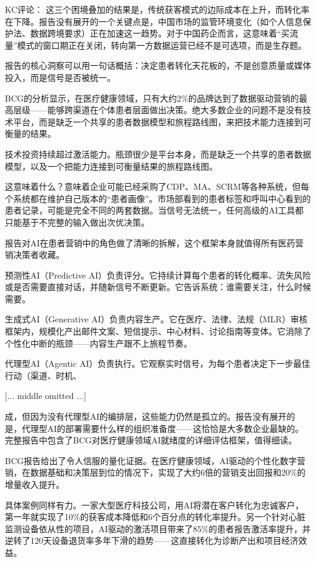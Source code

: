 \documentclass[11pt]{ctexart}
\begin{document}
KC评论： 这三个困境叠加的结果是，传统获客模式的边际成本在上升，而转化率在下降。报告没有展开的一个关键点是，中国市场的监管环境变化（如个人信息保护法、数据跨境要求）正在加速这一趋势。对于中国药企而言，这意味着“买流量”模式的窗口期正在关闭，转向第一方数据运营已经不是可选项，而是生存题。

报告的核心洞察可以用一句话概括：决定患者转化天花板的，不是创意质量或媒体投入，而是信号是否被统一。

BCG的分析显示，在医疗健康领域，只有大约2\%的品牌达到了数据驱动营销的最高层级——能够跨渠道在个体患者层面做出决策。绝大多数企业的问题不是没有技术平台，而是缺乏一个共享的患者数据模型和旅程路线图，来把技术能力连接到可衡量的结果。

技术投资持续超过激活能力。瓶颈很少是平台本身，而是缺乏一个共享的患者数据模型，以及一个把能力连接到可衡量结果的旅程路线图。

这意味着什么？意味着企业可能已经采购了CDP、MA、SCRM等各种系统，但每个系统都在维护自己版本的“患者画像”。市场部看到的患者标签和呼叫中心看到的患者记录，可能是完全不同的两套数据。当信号无法统一，任何高级的AI工具都只能基于不完整的输入做出次优决策。

报告对AI在患者营销中的角色做了清晰的拆解，这个框架本身就值得所有医药营销决策者收藏。

预测性AI（Predictive AI）负责评分。它持续计算每个患者的转化概率、流失风险或是否需要直接对话，并随新信号不断更新。它告诉系统：谁需要关注，什么时候需要。

生成式AI（Generative AI）负责内容生产。它在医疗、法律、法规（MLR）审核框架内，规模化产出邮件文案、短信提示、中心材料、讨论指南等变体。它消除了个性化中断的瓶颈——内容生产跟不上旅程节奏。

代理型AI（Agentic AI）负责执行。它观察实时信号，为每个患者决定下一步最佳行动（渠道、时机、

[... middle omitted ...]

成，但因为没有代理型AI的编排层，这些能力仍然是孤立的。报告没有展开的是，代理型AI的部署需要什么样的组织准备度——这恰恰是大多数企业最缺的。完整报告中包含了BCG对医疗健康领域AI就绪度的详细评估框架，值得细读。

BCG报告给出了令人信服的量化证据。在医疗健康领域，AI驱动的个性化数字营销，在数据基础和决策层到位的情况下，实现了大约6倍的营销支出回报和20\%的增量收入提升。

具体案例同样有力。一家大型医疗科技公司，用AI将潜在客户转化为忠诚客户，第一年就实现了10\%的获客成本降低和6个百分点的转化率提升。另一个针对心脏监测设备依从性的项目，AI驱动的激活项目带来了85\%的患者报告激活率提升，并逆转了120天设备退货率多年下滑的趋势——这直接转化为诊断产出和项目经济效益。
\end{document}
